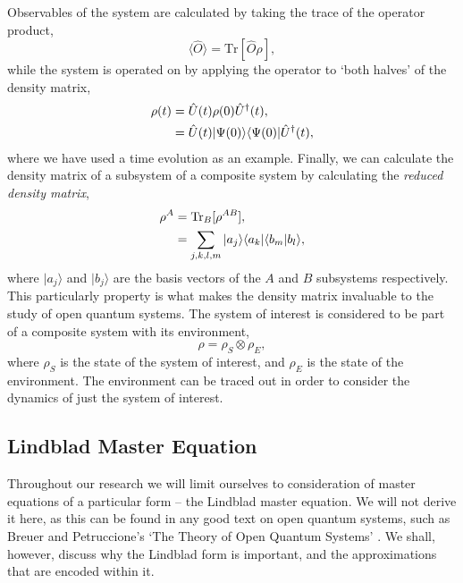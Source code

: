Observables of the system are calculated by taking the trace of the operator product,
\begin{equation}
	\langle \hat{O} \rangle = \mathrm{Tr}[\hat{O}\rho],
	\label{eq:oqs2-5}
\end{equation}
while the system is operated on by applying the operator to `both halves' of the density matrix,
\begin{align}
	\rho (t) &= \hat{U}(t) \rho(0) \hat{U}^{\dagger}(t), \notag \\
	&= \hat{U}(t) | \Psi(0) \rangle \langle \Psi(0) | \hat{U}^{\dagger}(t),
	\label{eq:oqs2-6}
\end{align}  
where we have used a time evolution as an example. Finally, we can calculate the density matrix of a subsystem of a composite system by calculating the \emph{reduced density matrix},
\begin{align}
	\rho^{A} &= \mathrm{Tr}_{B}[\rho^{AB}], \notag \\
	&= \sum_{j,k,l,m} |a_{j} \rangle \langle a_{k}| \langle b_{m} | b_{l} \rangle,
	\label{eq:oqs2-7}
\end{align}
where \(|a_{j} \rangle\) and \(|b_{j} \rangle\) are the basis vectors of the \(A\) and \(B\) subsystems respectively. This particularly property is what makes the density matrix invaluable to the study of open quantum systems. The system of interest is considered to be part of a composite system with its environment,
\begin{equation}
	\rho = \rho_{S} \otimes \rho_{E},
	\label{eq:oqs2-8}
\end{equation}
where \(\rho_{S}\) is the state of the system of interest, and \(\rho_{E}\) is the state of the environment. The environment can be traced out in order to consider the dynamics of just the system of interest. 

\subsection{Lindblad Master Equation}
Throughout our research we will limit ourselves to consideration of master equations of a particular form -- the Lindblad master equation. We will not derive it here, as this can be found in any good text on open quantum systems, such as Breuer and Petruccione's `The Theory of Open Quantum Systems' \cite{BP_TMQME}. We shall, however, discuss why the Lindblad form is important, and the approximations that are encoded within it. 

